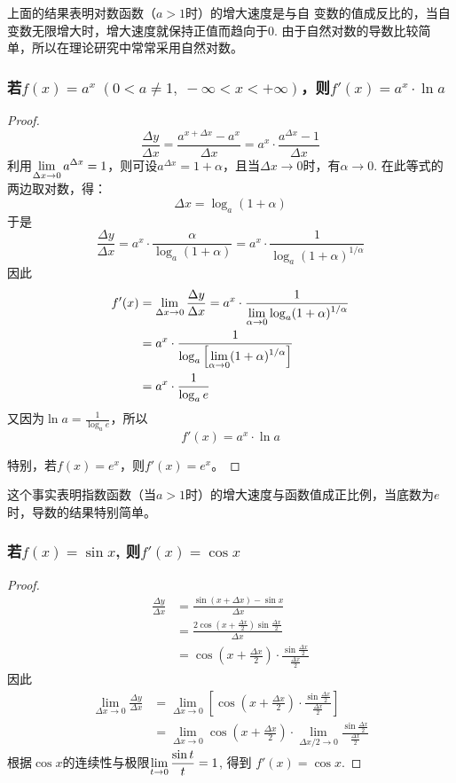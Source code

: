 上面的结果表明对数函数（$a>1$时）的增大速度是与自
变数的值成反比的，当自变数无限增大时，增大速度就保持正值而趋向于0. 由于自然对数的导数比较简单，所以在理论研究中常常采用自然对数。

\subsubsection{若$f(x)=a^x\; (0<a\ne 1,\; -\infty<x<+\infty)$，则$f'(x)=a^x\cdot \ln a$}

\begin{proof}
    \[\frac{\Delta y}{\Delta x}=\frac{a^{x+\Delta x}-a^x}{\Delta x}=a^x\cdot \frac{a^{\Delta x}-1}{\Delta x}\]
利用$\displaystyle\lim_{\Delta x\to 0}a^{\Delta x}=1$，则可设$a^{\Delta x}=1+\alpha$，且当$\Delta x\to 0$时，有$\alpha\to 0$. 在此等式的两边取对数，得：
\[\Delta x=\log_a(1+\alpha)\]
于是
\[\frac{\Delta y}{\Delta x}=a^x\cdot \frac{\alpha}{\log_a(1+\alpha)}=a^x\cdot \frac{1}{\log_a(1+\alpha)^{1/\alpha}}\]
因此
\[\begin{split}
    f'(x)&=\lim_{\Delta x\to 0}\dfrac{\Delta y}{\Delta x}=a^x\cdot \dfrac{1}{\displaystyle\lim_{\alpha\to 0}\log_a(1+\alpha)^{1/\alpha}}\\
    &=a^x\cdot \dfrac{1}{\log_a\left[\displaystyle\lim_{\alpha\to 0}(1+\alpha)^{1/\alpha}\right]}\\
    &=a^x\cdot \dfrac{1}{\log_a e}
\end{split}\]
又因为$\ln a=\frac{1}{\log_a e}$，所以
\[f'(x)=a^x\cdot \ln a\]

特别，若$f(x)=e^x$，则$f'(x)=e^x$。
\end{proof}

这个事实表明指数函数（当$a>1$时）的增大速度与函数值成正比例，当底数为$e$时，导数的结果特别简单。


\subsubsection{若$f(x)=\sin x$, 则$f'(x)=\cos x$}
\begin{proof}
    \[\begin{split}
\frac{\Delta y}{\Delta x}&=\frac{\sin(x+\Delta x)-\sin x}{\Delta x}\\
&=\frac{2\cos\left(x+\frac{\Delta x}{2}\right)\sin\frac{\Delta x}{2}}{\Delta x}\\
&=\cos\left(x+\frac{\Delta x}{2}\right)\cdot \frac{\sin\frac{\Delta x}{2}}{\frac{\Delta x}{2}}
    \end{split}\]
因此
\[\begin{split}
    \lim_{\Delta x\to 0}\frac{\Delta y}{\Delta x}&=\lim_{\Delta x\to 0}\left[\cos\left(x+\frac{\Delta x}{2}\right)\cdot \frac{\sin\frac{\Delta x}{2}}{\frac{\Delta x}{2}}\right]\\
    &=\lim_{\Delta x\to 0}\cos\left(x+\frac{\Delta x}{2}\right)\cdot \lim_{\Delta x/2\to 0}\frac{\sin\frac{\Delta x}{2}}{\frac{\Delta x}{2}}
\end{split}\]
根据$\cos x$的连续性与极限$\displaystyle\lim_{t\to 0}\dfrac{\sin t}{t}=1$, 得到
$f' (x) =\cos x$.
\end{proof}


